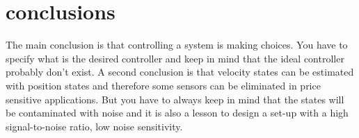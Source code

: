 \section{conclusions}
The main conclusion is that controlling a system is making choices. You have to specify what is the desired controller and keep in mind that the ideal controller probably don't exist. A second conclusion is that velocity states can be estimated with position states and therefore some sensors can be eliminated in price sensitive applications. But you have to always keep in mind that the states will be contaminated with noise and it is also a lesson to design a set-up with a high signal-to-noise ratio, low noise sensitivity.      